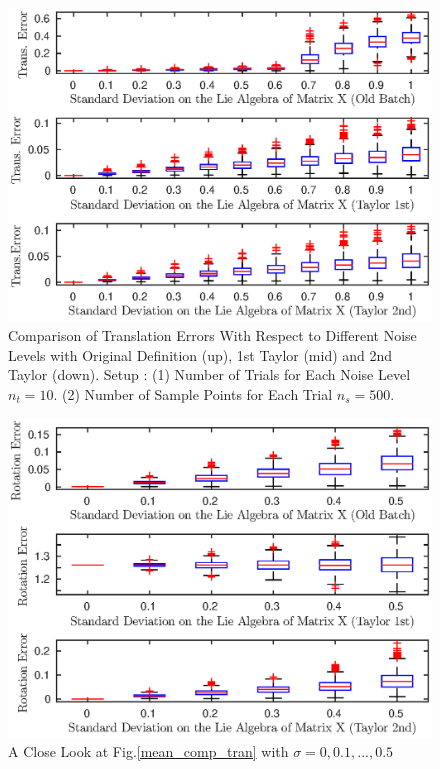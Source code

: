 \documentclass[twocolumn,10pt]{asme2ej}
\begin{document}
\begin{figure}[h]
\includegraphics[scale = 0.60]{Mean_Definition_Figures/mean_trans_abs_10.eps}
\caption{Comparison of Translation Errors With Respect to Different Noise Levels with Original Definition (up), 1st Taylor (mid) and 2nd Taylor (down). Setup : (1) Number of Trials for Each Noise Level $n_t = 10$. (2) Number of Sample Points for Each Trial $n_s = 500$. }
\centering
\label{mean_comp_rot}
\end{figure}

\begin{figure}[h]
\includegraphics[scale = 0.60]{Mean_Definition_Figures/mean_rot_abs_5.eps}
\caption{A Close Look at Fig.\ref{mean_comp_tran} with $\sigma = 0, 0.1, ..., 0.5$ }
\centering
\end{figure}
\end{document}
